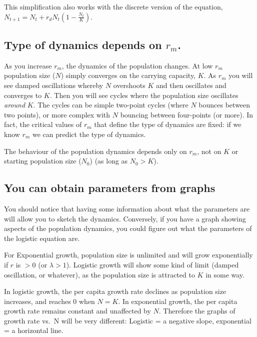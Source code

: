 \documentclass[
  a4paper]{book}
\begin{document}
This simplification also works with the discrete version of the equation, \(N_{t+1}=N_{t}+r_{d} N_{t}\left(1-\frac{N_{t}}{K}\right)\).

\hypertarget{type-of-dynamics-depends-on-r_m.}{%
\subsection{\texorpdfstring{Type of dynamics depends on \(r_m\).}{Type of dynamics depends on r\_m.}}\label{type-of-dynamics-depends-on-r_m.}}

As you increase \(r_m\), the dynamics of the population changes. At low \(r_m\) population size (\(N\)) simply converges on the carrying capacity, \(K\). As \(r_m\) you will see damped oscillations whereby \(N\) overshoots \(K\) and then oscillates and converges to \(K\). Then you will see cycles where the population size oscillates \emph{around} \(K\). The cycles can be simple two-point cycles (where \(N\) bounces between two points), or more complex with \(N\) bouncing between four-points (or more). In fact, the critical values of \(r_m\) that define the type of dynamics are fixed: if we know \(r_m\) we can predict the type of dynamics.

The behaviour of the population dynamics depends only on \(r_m\), not on \(K\) or starting population size (\(N_0\)) (as long as \(N_0 > K\)).

\hypertarget{you-can-obtain-parameters-from-graphs}{%
\subsection{You can obtain parameters from graphs}\label{you-can-obtain-parameters-from-graphs}}

You should notice that having some information about what the parameters are will allow you to sketch the dynamics. Conversely, if you have a graph showing aspects of the population dynamics, you could figure out what the parameters of the logistic equation are.

For Exponential growth, population size is unlimited and will grow exponentially if \(r\) is \(>0\) (or \(\lambda > 1\)). Logistic growth will show some kind of limit (damped oscillation, or whatever), as the population size is attracted to \(K\) in some way.

In logistic growth, the per capita growth rate declines as population size increases, and reaches \(0\) when \(N = K\). In exponential growth, the per capita growth rate remains constant and unaffected by \(N\). Therefore the graphs of growth rate vs.~N will be very different: Logistic = a negative slope, exponential = a horizontal line.
\end{document}
